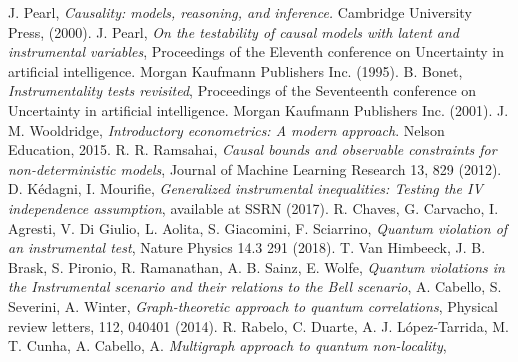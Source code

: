 \documentclass[letterpaper]{article}
\begin{document}

\begin{thebibliography}{}
     J. Pearl, 
        {\em Causality: models, reasoning, and inference.}
        Cambridge University Press, (2000).
     J. Pearl, 
        {\em On the testability of causal models with latent and instrumental variables}, 
        Proceedings of the Eleventh conference on Uncertainty in artificial
        intelligence. Morgan Kaufmann Publishers Inc. (1995).
     B. Bonet, {\em Instrumentality tests revisited},
        Proceedings of the Seventeenth conference on Uncertainty in artificial
        intelligence. Morgan Kaufmann Publishers Inc. (2001).
             J. M. Wooldridge, {\em Introductory econometrics: A modern approach}. Nelson Education, 2015.
        R. R. Ramsahai, {\em Causal bounds and observable constraints for non-deterministic models},
        Journal of Machine Learning Research 13, 829 (2012).
          D. Kédagni, I. Mourifie, {\em Generalized instrumental inequalities: Testing the IV independence assumption}, available at SSRN (2017).
     R. Chaves, G. Carvacho, I. Agresti, V. Di Giulio, L. Aolita,
        S. Giacomini, F. Sciarrino, 
        {\em Quantum violation of an instrumental test}, 
        Nature Physics 14.3 291 (2018).
      T. Van Himbeeck, J. B. Brask, S. Pironio, R. Ramanathan, A. B. Sainz, E. Wolfe, 
        {\em Quantum violations in the Instrumental scenario and their relations to the Bell scenario},
      A. Cabello, S. Severini, A. Winter,
         {\em Graph-theoretic approach to quantum correlations}, 
         Physical review letters, 112, 040401 (2014).
      R. Rabelo, C. Duarte, A. J.  López-Tarrida, M. T. Cunha, A. Cabello, A. 
         {\em Multigraph approach to quantum non-locality},

\end{thebibliography}
\end{document}
